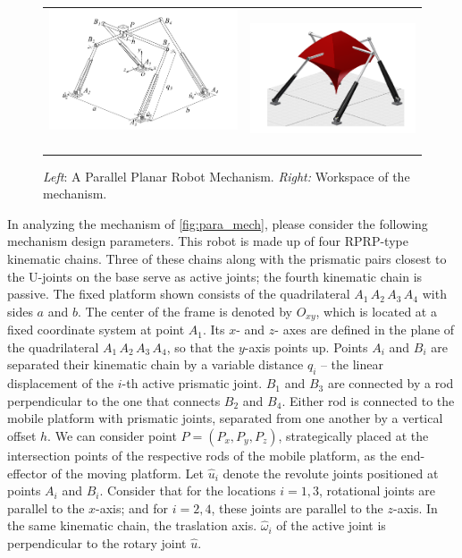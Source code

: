 \begin{figure}[tb!]
	\centering
	\begin{tabular}{@{}c@{}c@{}}
	\includegraphics[width=0.50\linewidth ,height=0.4\columnwidth]{figures/parallel_translational.png} \,\,
	&
	\includegraphics[width=0.48\columnwidth,height=0.4\columnwidth]{figures/parallel_translational_workspace.png}
	\end{tabular}
	\caption{\textit{Left}: A Parallel Planar Robot Mechanism. \textit{Right:} Workspace of the mechanism.}
	\label{fig:para_mech}
\end{figure}

In analyzing the mechanism of \autoref{fig:para_mech}, please consider the following mechanism design parameters. This robot  is made up of four RPRP-type kinematic chains. Three of these chains along with the prismatic pairs closest to the U-joints on the base serve as active joints; the fourth kinematic chain is passive. The fixed platform shown consists of the quadrilateral $A_1 \, A_2 \, A_3 \, A_4$ with sides $a$ and $b$. The center of the frame is denoted by $O_{xy}$, which is located at a fixed coordinate system at point $A_1$. Its $x$- and $z$- axes are defined in the plane of the quadrilateral $A_1 \, A_2 \, A_3 \, A_4$, so that the $y$-axis points up. Points $A_i$ and $B_i$ are separated their kinematic chain by a variable distance $q_i$ --  the linear displacement of the $i$-th active prismatic joint. $B_1$ and $B_3$ are connected by a rod perpendicular to the one that connects $B_2$ and $B_4$. Either rod is connected to the mobile platform with prismatic joints, separated from one another by a vertical offset $h$. We can consider point $P = (P_x, P_y, P_z)$, strategically placed at the intersection points of the respective rods of the mobile platform, as the end-effector of the moving platform. Let $\hat{u}_i$ denote the revolute joints positioned at points $A_i$ and $B_i$. Consider that for the locations $i=1,3$, rotational joints are parallel to the $x$-axis; and for $i=2,4$, these joints are parallel to the $z$-axis. In the same kinematic chain, the traslation axis. $\hat{\omega}_i$ of the active joint is perpendicular to the rotary joint $\hat{u}$.